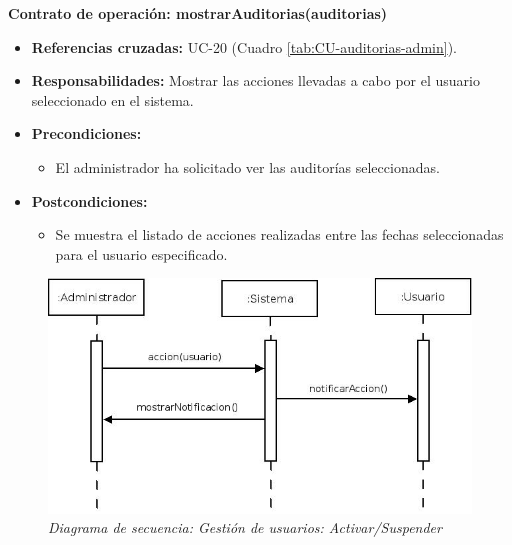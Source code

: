 \textbf{Contrato de operación: mostrarAuditorias(auditorias)}
\begin{itemize}
\item \textbf{Referencias cruzadas:} UC-20 (Cuadro \ref{tab:CU-auditorias-admin}).
\item \textbf{Responsabilidades:} Mostrar las acciones llevadas a cabo por el usuario seleccionado en el sistema.
\item \textbf{Precondiciones:} 
 \begin{itemize}
\item El administrador ha solicitado ver las auditorías seleccionadas.
\end {itemize}
\item \textbf{Postcondiciones:} 
 \begin{itemize}
\item Se muestra el listado de acciones realizadas entre las fechas seleccionadas para el usuario especificado.
\end {itemize}
\end {itemize}

\vspace{10mm}

\begin{figure}[H]
\centering
  \includegraphics[scale=.50]{img/secuencias/gestion-usuarios-activar-suspender.jpeg}
  \caption{\textit{Diagrama de secuencia: Gestión de usuarios: Activar/Suspender}}
  \label{fig:secuencia-gestion-usuarios-activar-suspender}
\end{figure}

